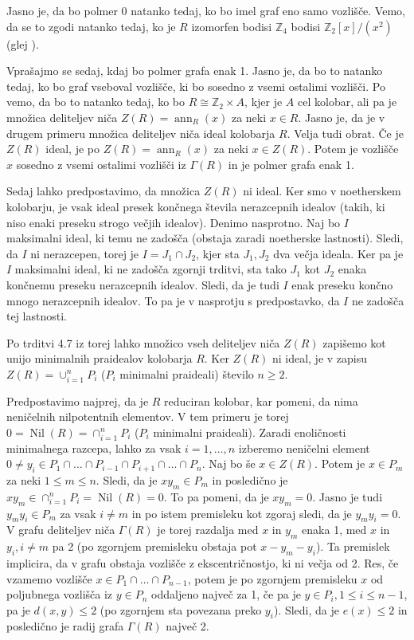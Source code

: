 \documentclass[a4paper, 12pt]{amsart}
\theoremstyle{definition} %
\theoremstyle{plain} %
\newcommand{\Z}{\mathbb Z}
\DeclareMathOperator{\ann}{ann}
\DeclareMathOperator{\nil}{Nil}
\begin{document}
Jasno je, da bo polmer 0 natanko tedaj, ko bo imel graf eno samo vozlišče. Vemo, da se to zgodi natanko tedaj, ko je $R$ izomorfen bodisi $\Z_4$ bodisi $\Z_2[x]/(x^2)$ (glej \cite{Anderson-klasifikacijaMalihGrafov}).

Vprašajmo se sedaj, kdaj bo polmer grafa enak 1. Jasno je, da bo to natanko tedaj, ko bo graf vseboval vozlišče, ki bo sosedno z vsemi ostalimi vozlišči. Po \cite[Izrek 3.12]{diploma} vemo, da bo to natanko tedaj, ko bo $R\cong \Z_2 \times A$, kjer je $A$ cel kolobar, ali pa je množica deliteljev niča $Z(R) = \ann_R(x)$ za neki $x\in R$. Jasno je, da je v drugem primeru množica deliteljev niča ideal kolobarja $R$. Velja tudi obrat. Če je $Z(R)$ ideal, je po \cite[Theorem 82]{Kaplansky} $Z(R)=\ann_R(x)$ za neki $x\in Z(R)$. Potem je vozlišče $x$ sosedno z vsemi ostalimi vozlišči iz $\Gamma(R)$ in je polmer grafa enak 1.

Sedaj lahko predpostavimo, da množica $Z(R)$ ni ideal. Ker smo v noetherskem kolobarju, je vsak ideal presek končnega števila nerazcepnih idealov (takih, ki niso enaki preseku strogo večjih idealov). Denimo nasprotno. Naj bo $I$ maksimalni ideal, ki temu ne zadošča (obstaja zaradi noetherske lastnosti). Sledi, da $I$ ni nerazcepen, torej je $I=J_1\cap J_2$, kjer sta $J_1,J_2$ dva večja ideala. Ker pa je $I$ maksimalni ideal, ki ne zadošča zgornji trditvi, sta tako $J_1$ kot $J_2$ enaka končnemu preseku nerazcepnih idealov. Sledi, da je tudi $I$ enak preseku končno mnogo nerazcepnih idealov. To pa je v nasprotju s predpostavko, da $I$ ne zadošča tej lastnosti.

Po trditvi 4.7 iz \cite{Atiyah} torej lahko množico vseh deliteljev niča $Z(R)$ zapišemo kot unijo minimalnih praidealov kolobarja $R$. Ker $Z(R)$ ni ideal, je v zapisu $Z(R) = \cup_{i=1}^n P_i$ ($P_i$ minimalni praideali) število $n\ge2$.


Predpostavimo najprej, da je $R$ reduciran kolobar, kar pomeni, da nima neničelnih nilpotentnih elementov. V tem primeru je torej $0=\nil(R)=\cap_{i=1}^n P_i$ ($P_i$ minimalni praideali). Zaradi enoličnosti minimalnega razcepa, lahko za vsak $i=1,\dots,n$ izberemo neničelni element $0\neq y_i\in P_1 \cap\dots \cap P_{i-1}\cap P_{i+1}\cap\dots \cap P_n$. Naj bo še $x\in Z(R)$. Potem je $x\in P_m$ za neki $1\le m \le n$. Sledi, da je $xy_m\in P_m$ in posledično je $xy_m \in \cap_{i=1}^n P_i = \nil(R) = 0$. To pa pomeni, da je $xy_m = 0$. Jasno je tudi $y_m y_i\in P_m$ za vsak $i\neq m$ in po istem premisleku kot zgoraj sledi, da je $y_m y_i = 0$. V grafu deliteljev niča $\Gamma(R)$ je torej razdalja med $x$ in $y_m$ enaka 1, med $x$ in $y_i, i\neq m$ pa 2 (po zgornjem premisleku obstaja pot $x-y_m-y_i$). Ta premislek implicira, da v grafu obstaja vozlišče z ekscentričnostjo, ki ni večja od 2. Res, če vzamemo vozlišče $x\in P_1\cap \dots \cap P_{n-1}$, potem je po zgornjem premisleku $x$ od poljubnega vozlišča iz $y \in P_n$ oddaljeno največ za 1, če pa je $y\in P_i, 1 \le i \le n-1$, pa je $d(x,y) \le 2$ (po zgornjem sta povezana preko $y_i$). Sledi, da je $e(x) \le 2$ in posledično je radij grafa $\Gamma(R)$ največ 2.
\end{document}
